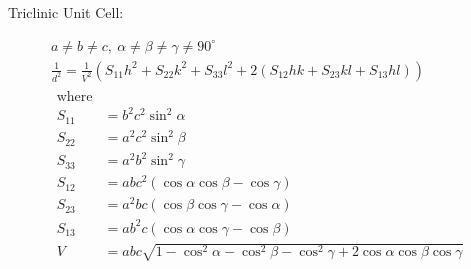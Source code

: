 \documentclass{article}
\begin{document}
\begin{appendices}
Triclinic Unit Cell:

\begin{gather*}
	\label{eq:triclinic}
	a \neq b \neq c, \ \alpha \neq \beta \neq \gamma \neq 90^{\circ} \\
	\frac{1}{d^2} = \frac{1}{V^2}\left(S_{11} h^2 + S_{22} k^2 + S_{33} l^2 + 2(S_{12} hk +S_{23} kl + S_{13} hl)  \right) \\
	\begin{align*}
	\text{where} \\
	S_{11} &= b^2c^2 \sin^2 \alpha \\
	S_{22} &= a^2c^2 \sin^2 \beta \\
	S_{33} &= a^2b^2 \sin^2 \gamma \\
	S_{12} &= abc^2(\cos \alpha \cos \beta - \cos \gamma) \\
	S_{23} &= a^2bc(\cos \beta \cos \gamma - \cos \alpha) \\
	S_{13} &= ab^2c(\cos \alpha \cos \gamma - \cos \beta) \\
	V &= abc\sqrt{1 - \cos^2 \alpha - \cos^2 \beta - \cos^2 \gamma + 2\cos \alpha \cos \beta \cos \gamma}
	\end{align*}
\end{gather*}

\pagebreak{}


\end{appendices}
\end{document}

